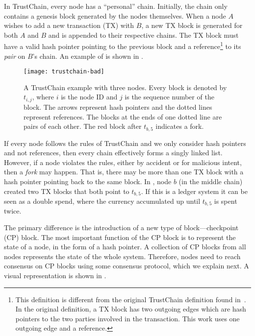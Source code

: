 In TrustChain, every node has a ``personal'' chain. 
Initially, the chain only contains a genesis block generated by the nodes themselves.
When a node $A$ wishes to add a new transaction (TX) with $B$,
a new TX block is generated for both $A$ and $B$ and is appended to their respective chains.
The TX block must have a valid hash pointer pointing to the previous block and a reference\footnote{This definition is different from the original TrustChain definition found in~\cite{multichain}.
    In the original definition, a TX block has two outgoing edges which are hash pointers to the two parties involved in the transaction.
    This work uses one outgoing edge and a reference.} to its \emph{pair} on $B$'s chain.
An example of is shown in .

\begin{figure}
    \texttt{[image: trustchain-bad]}
    \centering
    \caption{
    A TrustChain example with three nodes.
    Every block is denoted by $t_{i,j}$, where $i$ is the node ID and $j$ is the sequence number of the block.
    The arrows represent hash pointers and the dotted lines represent references.
    The blocks at the ends of one dotted line are pairs of each other.
    The red block after $t_{b, 5}$ indicates a fork.}
    \label{fig:trustchain-bad}
\end{figure}

If every node follows the rules of TrustChain and we only consider hash pointers and not references,
then every chain effectively forms a singly linked list.
However, if a node violates the rules,
either by accident or for malicious intent,
then a \emph{fork} may happen.
That is, there may be more than one TX block with a hash pointer pointing back to the same block.
In , node $b$ (in the middle chain) created two TX blocks that both point to $t_{b, 5}$.
If this is a ledger system it can be seen as a double spend, where the currency accumulated up until $t_{b, 5}$ is spent twice.

The primary difference is the introduction of a new type of block---checkpoint (CP) block.
The most important function of the CP block is to represent the state of a node, in the form of a hash pointer.
A collection of CP blocks from all nodes represents the state of the whole system.
Therefore, nodes need to reach consensus on CP blocks using some consensus protocol, which we explain next.
A visual representation is shown in .

